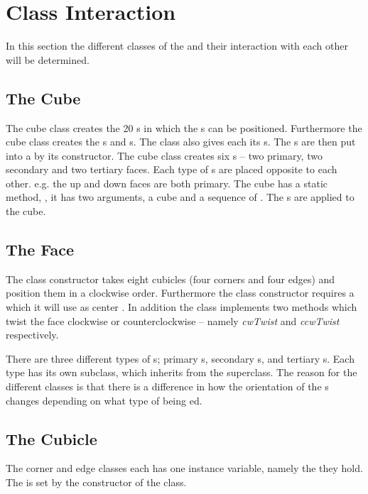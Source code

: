 \section{Class Interaction}
In this section the different classes of the \rubik{} and their interaction with each other will be determined.
\subsection{The Cube}
The cube class creates the 20 \cubicle{}s in which the \cpiece{}s can be positioned. Furthermore the cube class creates the \face{}s and \cubie{}s. The class also gives each \cpiece{} its \facelet{}s. The \cubicle{}s are then put into a \face{} by its constructor. The cube class creates six \face{}s -- two primary, two secondary and two tertiary faces. Each type of \face{}s are placed opposite to each other. e.g. the up and down faces are both primary. The cube has a static method, , it has two arguments, a cube and a sequence of \twist{}. The \twist{}s are applied to the cube.

\subsection{The Face}
The \face{} class constructor takes eight cubicles (four corners and four edges) and position them in a clockwise order. Furthermore the \face{} class constructor requires a \facelet{} which it will use as center \facelet{}. In addition the \face{} class implements two methods which twist the face clockwise or counterclockwise -- namely \textit{cwTwist} and \textit{ccwTwist} respectively.

There are three different types of \face{}s; primary \face{}s, secondary \face{}s, and tertiary \face{}s.
Each type has its own subclass, which inherits from the \face{} superclass.
The reason for the different classes is that there is a difference in how the orientation of the \cubie{}s changes depending on what type of \face{} being \twist{}ed.

\subsection{The Cubicle}
The corner and edge \cubicle{} classes each has one instance variable, namely the \cubie{} they hold. The \cpiece{} is set by the constructor of the \cubicle{} class.

